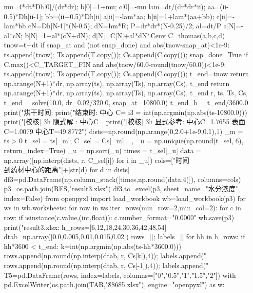 \begin{codelisting}
        mu=4*dt*Dh[0]/(dr*dr); b[0]=1+mu; c[0]=-mu
        lam=dt/(dr*dr*ii); aa=(ii-0.5)*Dh[ii-1]; bb=(ii+0.5)*Dh[ii]
        a[ii]=-lam*aa; b[ii]=1+lam*(aa+bb); c[ii]=-lam*bb
        cN=Dh[N-1]*(N-0.5); dN=hm*R; P=dr*dr*(N-0.25)/2; al=dt/P
        a[N]=-al*cN; b[N]=1+al*(cN+dN); d[N]=C[N]+al*dN*Cenv
        C=thomas(a,b,c,d)
        tnow=t+dt
        if snap_at and (not snap_done) and abs(tnow-snap_at)<1e-9:
            ts.append(tnow); Ts.append(T.copy()); Cs.append(C.copy()); snap_done=True
        if C.max()<C_TARGET_FIN and abs(tnow/60.0-round(tnow/60.0))<1e-9:
            ts.append(tnow); Ts.append(T.copy()); Cs.append(C.copy()); t_end=tnow
            return np.arange(N+1)*dr, np.array(ts), np.array(Ts), np.array(Cs), t_end
    return np.arange(N+1)*dr, np.array(ts), np.array(Ts), np.array(Cs), t_end
r, ts, Ts, Cs, t_end = solve(10.0, dr=0.02/320.0, snap_at=10800.0)
t_end_h = t_end/3600.0
print("烘干时间: %
print("结束时: 中心 C=%
i3 = int(np.argmin(np.abs(ts-10800.0)))
print("[校核] 3h 隐式解 : 中心C=%
print("[校核] 3h 显式参考: 中心C=1.7655 表面C=1.0079 中心T=49.8772")
dists=np.round(np.arange(0,2.0+1e-9,0.1),1)
_m = ts > 0
t_sel = ts[_m]; C_sel = Cs[_m]
_, _u = np.unique(np.round(t_sel, 6), return_index=True)
_u = np.sort(_u)
times = t_sel[_u]
data = np.array([np.interp(dists, r, C_sel[i]) for i in _u])
cols=["时间\\到药材中心的距离"]+[str(d) for d in dists]
df3=pd.DataFrame(np.column_stack([times,np.round(data,4)]), columns=cols)
p3=os.path.join(RES,"result3.xlsx")
df3.to_excel(p3, sheet_name="水分浓度", index=False)
from openpyxl import load_workbook
wb=load_workbook(p3)
for ws in wb.worksheets:
    for row in ws.iter_rows(min_row=2,min_col=2):
        for c in row:
            if isinstance(c.value,(int,float)): c.number_format="0.0000"
wb.save(p3)
print("result3.xlsx: %
h_rows=[6,12,18,24,30,36,42,48,54]
dtab=np.array([0.0,0.005,0.01,0.015,0.02])
rows=[]; labels=[]
for hh in h_rows:
    if hh*3600 < t_end:
        k=int(np.argmin(np.abs(ts-hh*3600.0)))
        rows.append(np.round(np.interp(dtab, r, Cs[k]),4)); labels.append("%
rows.append(np.round(np.interp(dtab, r, Cs[-1]),4)); labels.append("%
T5=pd.DataFrame(rows, index=labels, columns=["0","0.5","1","1.5","2"])
with pd.ExcelWriter(os.path.join(TAB,"\u88685.xlsx"), engine="openpyxl") as w:

\end{codelisting}
